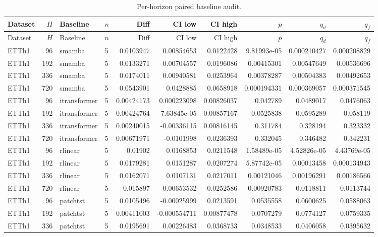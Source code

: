 \begin{longtable}{lrllrrrrrr}
\caption{Per-horizon paired baseline audit.}\\
\toprule
Dataset & $H$ & Baseline & $n$ & Diff & CI low & CI high & $p$ & $q_d$ & $q_f$ \\
\midrule
\endfirsthead
\toprule
Dataset & $H$ & Baseline & $n$ & Diff & CI low & CI high & $p$ & $q_d$ & $q_f$ \\
\midrule
\endhead
ETTh1 & 96 & smamba & 5 & 0.0103947 & 0.00854653 & 0.0122428 & 9.81993e-05 & 0.000210427 & 0.000208829 \\
ETTh1 & 192 & smamba & 5 & 0.0133271 & 0.00704557 & 0.0196086 & 0.00415301 & 0.00547649 & 0.00536696 \\
ETTh1 & 336 & smamba & 5 & 0.0174011 & 0.00940581 & 0.0253964 & 0.00378287 & 0.00504383 & 0.00492653 \\
ETTh1 & 720 & smamba & 5 & 0.0543901 & 0.0428885 & 0.0658918 & 0.000194331 & 0.000369057 & 0.000371545 \\
ETTh1 & 96 & itransformer & 5 & 0.00424173 & 0.000223098 & 0.00826037 & 0.042789 & 0.0489017 & 0.0476063 \\
ETTh1 & 192 & itransformer & 5 & 0.00424764 & -7.63845e-05 & 0.00857167 & 0.0525838 & 0.0595289 & 0.058119 \\
ETTh1 & 336 & itransformer & 5 & 0.00240015 & -0.00336115 & 0.00816145 & 0.311784 & 0.328194 & 0.323332 \\
ETTh1 & 720 & itransformer & 5 & 0.00671971 & -0.0101998 & 0.0236393 & 0.332045 & 0.346482 & 0.342231 \\
ETTh1 & 96 & rlinear & 5 & 0.01902 & 0.0168853 & 0.0211548 & 1.58489e-05 & 4.52826e-05 & 4.43769e-05 \\
ETTh1 & 192 & rlinear & 5 & 0.0179281 & 0.0151287 & 0.0207274 & 5.87742e-05 & 0.00013458 & 0.000134943 \\
ETTh1 & 336 & rlinear & 5 & 0.0162071 & 0.0107131 & 0.0217011 & 0.00121046 & 0.00196291 & 0.00186566 \\
ETTh1 & 720 & rlinear & 5 & 0.015897 & 0.00653532 & 0.0252586 & 0.00920783 & 0.0118811 & 0.0113744 \\
ETTh1 & 96 & patchtst & 5 & 0.0105496 & -0.00025999 & 0.0213591 & 0.0535558 & 0.0600625 & 0.0588063 \\
ETTh1 & 192 & patchtst & 5 & 0.00411003 & -0.000554711 & 0.00877478 & 0.0707279 & 0.0774127 & 0.0759335 \\
ETTh1 & 336 & patchtst & 5 & 0.0195691 & 0.00226483 & 0.0368733 & 0.0348533 & 0.0406058 & 0.0395632 \\

\end{longtable}
